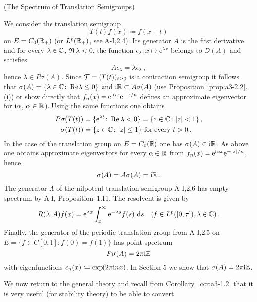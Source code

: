 \begin{example}{(The Spectrum of Translation Semigroups)}\label{ex:a3-2.4}

We consider the translation semigroup
\[
T(t)f(x) \coloneqq f(x+t)
\]
on $E = C_{0}(\mathbb{R}_{+})$ (or $L^{p}(\mathbb{R}_{+})$, see A-I,2.4).
Its generator $A$ is the first derivative and for every $\lambda \in \mathbb{C}$, $\Re\,\lambda < 0$, the function $\epsilon_{\lambda} \colon x \mapsto \mathrm{e}^{\lambda x}$ belongs to $D(A)$ and satisfies
\[
A\epsilon_{\lambda} = \lambda\epsilon_{\lambda}\,,
\]
hence $\lambda \in P\sigma(A)$.
Since $\mathcal{T} = (T(t))_{t \geq 0}$ is a contraction semigroup it follows that $\sigma(A) = \{\lambda \in \mathbb{C} \colon 
\mathop{}\!\mathrm{Re}\lambda \leq 0\}$ and $\mathrm{i}\mathbb{R} \subset A\sigma(A)$ (use Proposition~\ref{prop:a3-2.2}.(i)) or show directly that $f_{n}(x) = \mathrm{e}^{ \mathrm{i}\alpha x}\mathrm{e}^{-x/n}$ defines an approximate eigenvector for $\mathrm{i}\alpha$, $\alpha \in \mathbb{R}$).
Using the same functions one obtains
\begin{align*}
	P\sigma(T(t)) &= \{\mathrm{e}^{\lambda t} \colon \mathop{}\!\mathrm{Re}\,\lambda < 0\} = \{z \in \mathbb{C} \colon |z| < 1\}\,,\\
	\sigma(T(t)) &= \{z \in \mathbb{C} \colon |z| \leq 1\} \text{ for every } t > 0\,.
\end{align*}
In the case of the translation group on $E = C_{0}(\mathbb{R})$ one has $\sigma(A) \subset \mathrm{i}\mathbb{R}$.
As above one obtains approximate eigenvectors for every $\alpha \in \mathbb{R}$ from 
$f_{n}(x) = \mathrm{e}^{\mathrm{i}\alpha x}\mathrm{e}^{-|x|/n}$, hence
\[
\sigma(A) = A\sigma(A) = \mathrm{i}\mathbb{R}\,.
\]
The generator $A$ of the nilpotent translation semigroup A-I,2.6 has empty spectrum by A-I, Proposition~1.11.
The resolvent is given by
\[
R(\lambda,A)f(x) = \mathrm{e}^{\lambda x}\int_{x}^{\infty}\mathrm{e}^{-\lambda s}f(s) \, \mathop{}\!\mathrm{d}{s} \quad (f \in L^{p}([0,\tau]), \lambda \in \mathbb{C})\,.
\]
Finally, the generator of the periodic translation group from A-I,2.5 on
\\
$E = \{f \in C[0,1] \colon f(0) = f(1)\}$ has point spectrum
\[
P\sigma(A) = 2\pi \mathrm{i}\mathbb{Z}
\]
with eigenfunctions $\epsilon_{n}(x) \coloneqq \exp(2\pi \mathrm{i} n x)$.
In Section 5 we show that $\sigma(A) = 2\pi \mathrm{i}\mathbb{Z}$.
\end{example}
We now return to the general theory and recall from Corollary~\ref{cor:a3-1.2} that it is very useful (\eg for stability theory) to be able to convert
